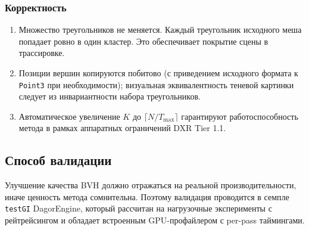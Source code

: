\subsubsection{Корректность}

\begin{enumerate}
    \item Множество треугольников не меняется. Каждый треугольник
      исходного меша попадает ровно в один кластер. Это
      обеспечивает покрытие сцены в трассировке.
    \item Позиции вершин копируются побитово (с приведением
      исходного формата к \texttt{Point3} при необходимости);
      визуальная эквивалентность теневой картинки следует из
      инвариантности набора треугольников.
    \item Автоматическое
      увеличение $K$ до $\lceil N/T_{\max}\rceil$ гарантируют
      работоспособность метода в рамках аппаратных ограничений
      DXR Tier 1.1.
\end{enumerate}

\subsection{Способ валидации}
\label{ssec:p3}

Улучшение качества BVH должно отражаться на реальной
производительности, иначе ценность метода сомнительна.
Поэтому валидация проводится в семпле \texttt{testGI} DagorEngine, который
рассчитан на нагрузочные эксперименты с рейтрейсингом и обладает
встроенным GPU-профайлером с per-pass таймингами.

